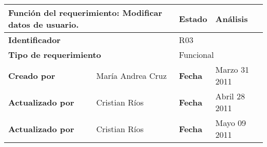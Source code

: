 %
\begin{center}
\begin{longtable}{|p{}|p{}|p{}|p{}|}
\hline
\multicolumn{2}{|p{0.45\textwidth}|}{{\bf {Función del requerimiento:}}
Modificar datos de usuario. } & {\bf{ Estado}} & Análisis \\
\hline
\multicolumn{2}{|p{0.45\textwidth}}{\bf Identificador} &
\multicolumn{2}{|p{0.45\textwidth}|}{R03} \\
\hline
\multicolumn{2}{|p{0.45\textwidth}}{\bf {Tipo de requerimiento}} &
\multicolumn{2}{|p{0.45\textwidth}|}{Funcional}\\
\hline
\bf {Creado por} & María Andrea Cruz & \bf {Fecha } & Marzo 31 2011\\
\hline
\bf {Actualizado por} &  Cristian Ríos & \bf {Fecha  }& Abril 28 2011\\
\hline
\bf {Actualizado por} &  Cristian Ríos & \bf {Fecha  }& Mayo 09 2011\\



\end{longtable}
\end{center}

